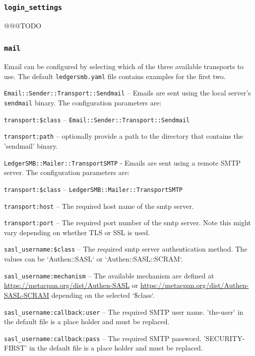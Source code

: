 \subsubsection{\texttt{login\_settings}}
@@@TODO

\subsubsection{\texttt{mail}}

Email  can be configured by selecting which of the three available transports to use. The default \texttt{ledgersmb.yaml} file contains examples for the first two.

\begin{description}
    
    \item{\texttt{Email::Sender::Transport::Sendmail}} – Emails are sent using the local server's \texttt{sendmail}  binary. The configuration parameters are:
    \begin{description}
        \item{\texttt{transport:\$class}} – \texttt{Email::Sender::Transport::Sendmail}
        \item{\texttt{transport:path}} – optionally provide a path to the directory that contains the 'sendmail' binary.
    \end{description}
    
    \item{\texttt{LedgerSMB::Mailer::TransportSMTP}} - Emails  are sent using a remote SMTP  server.  The configuration parameters are:
    \begin{description}
        \item{\texttt{transport:\$class}} – \texttt{LedgerSMB::Mailer::TransportSMTP}
        \item {\texttt{transport:host}} – The required host name of the smtp  server.
        \item {\texttt{transport:port}} – The required port number of the smtp server. Note this might vary depending on whether TLS or SSL is used.
        \item {\texttt{sasl\_username:\$class}} – The required smtp server authentication method. The values can be `Authen::SASL` or `Authen::SASL::SCRAM`.
        \item {\texttt{sasl\_username:mechanism}} –  The available mechanism are defined at \url{https://metacpan.org/dist/Authen-SASL} or \url{ https://metacpan.org/dist/Authen-SASL-SCRAM} depending on the selected `\$class`.
        \item {\texttt{sasl\_username:callback:user}} – The required SMTP user name.   'the-user' in the default file is a place holder and must be replaced.
        \item {\texttt{sasl\_username:callback:pass}} – The required SMTP password.  'SECURITY-FIRST' in the default file is a place holder and must be replaced.
    \end{description}
    

\end{description}
